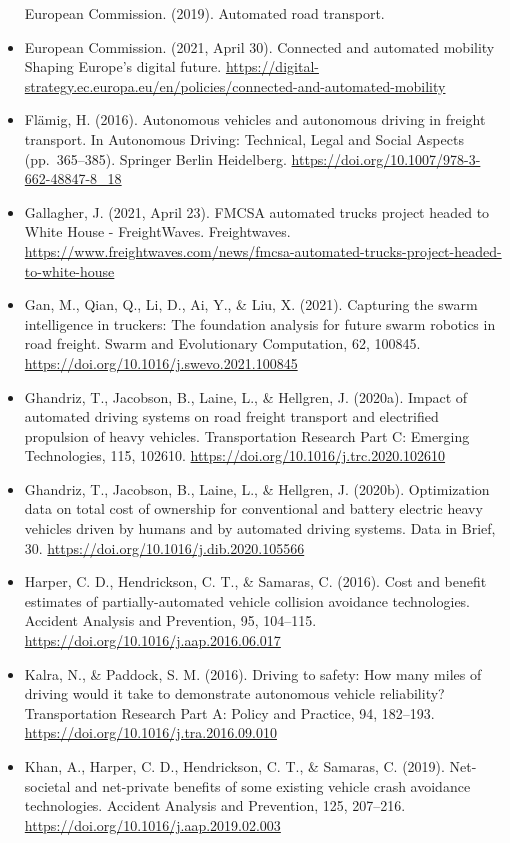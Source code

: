 \documentclass[
]{book}
\begin{document}
\begin{itemize}
  European Commission. (2019). Automated road transport.
\item
  European Commission. (2021, April 30). Connected and automated mobility \textbar{} Shaping Europe's digital future. \url{https://digital-strategy.ec.europa.eu/en/policies/connected-and-automated-mobility}
\item
  Flämig, H. (2016). Autonomous vehicles and autonomous driving in freight transport. In Autonomous Driving: Technical, Legal and Social Aspects (pp.~365--385). Springer Berlin Heidelberg. \url{https://doi.org/10.1007/978-3-662-48847-8_18}
\item
  Gallagher, J. (2021, April 23). FMCSA automated trucks project headed to White House - FreightWaves. Freightwaves. \url{https://www.freightwaves.com/news/fmcsa-automated-trucks-project-headed-to-white-house}
\item
  Gan, M., Qian, Q., Li, D., Ai, Y., \& Liu, X. (2021). Capturing the swarm intelligence in truckers: The foundation analysis for future swarm robotics in road freight. Swarm and Evolutionary Computation, 62, 100845. \url{https://doi.org/10.1016/j.swevo.2021.100845}
\item
  Ghandriz, T., Jacobson, B., Laine, L., \& Hellgren, J. (2020a). Impact of automated driving systems on road freight transport and electrified propulsion of heavy vehicles. Transportation Research Part C: Emerging Technologies, 115, 102610. \url{https://doi.org/10.1016/j.trc.2020.102610}
\item
  Ghandriz, T., Jacobson, B., Laine, L., \& Hellgren, J. (2020b). Optimization data on total cost of ownership for conventional and battery electric heavy vehicles driven by humans and by automated driving systems. Data in Brief, 30. \url{https://doi.org/10.1016/j.dib.2020.105566}
\item
  Harper, C. D., Hendrickson, C. T., \& Samaras, C. (2016). Cost and benefit estimates of partially-automated vehicle collision avoidance technologies. Accident Analysis and Prevention, 95, 104--115. \url{https://doi.org/10.1016/j.aap.2016.06.017}
\item
  Kalra, N., \& Paddock, S. M. (2016). Driving to safety: How many miles of driving would it take to demonstrate autonomous vehicle reliability? Transportation Research Part A: Policy and Practice, 94, 182--193. \url{https://doi.org/10.1016/j.tra.2016.09.010}
\item
  Khan, A., Harper, C. D., Hendrickson, C. T., \& Samaras, C. (2019). Net-societal and net-private benefits of some existing vehicle crash avoidance technologies. Accident Analysis and Prevention, 125, 207--216. \url{https://doi.org/10.1016/j.aap.2019.02.003}

\end{itemize}
\end{document}
